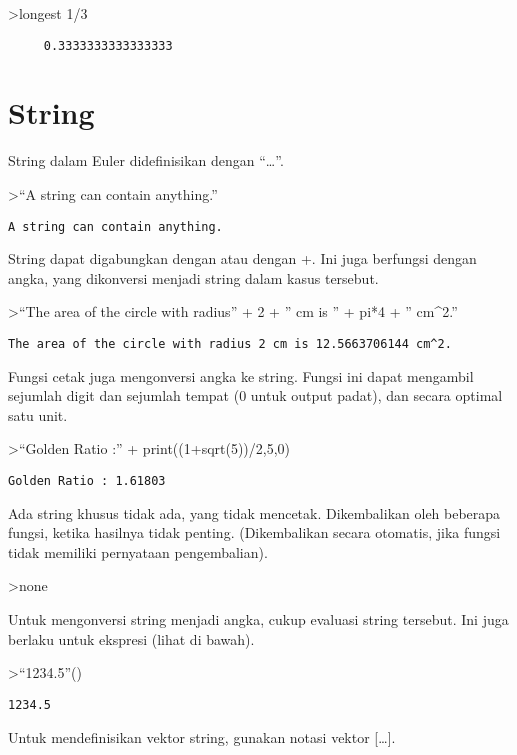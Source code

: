 \documentclass[
]{book}
\begin{document}
\textgreater longest 1/3

\begin{verbatim}
     0.3333333333333333 
\end{verbatim}

\section{String}\label{string}

String dalam Euler didefinisikan dengan ``\ldots{}''.

\textgreater{}``A string can contain anything.''

\begin{verbatim}
A string can contain anything.
\end{verbatim}

String dapat digabungkan dengan \textbar{} atau dengan +. Ini juga berfungsi dengan angka, yang dikonversi menjadi string dalam kasus tersebut.

\textgreater{}``The area of the circle with radius'' + 2 + '' cm is '' + pi*4 + '' cm\^{}2.''

\begin{verbatim}
The area of the circle with radius 2 cm is 12.5663706144 cm^2.
\end{verbatim}

Fungsi cetak juga mengonversi angka ke string. Fungsi ini dapat mengambil sejumlah digit dan sejumlah tempat (0 untuk output padat), dan secara optimal satu unit.

\textgreater{}``Golden Ratio :'' + print((1+sqrt(5))/2,5,0)

\begin{verbatim}
Golden Ratio : 1.61803
\end{verbatim}

Ada string khusus tidak ada, yang tidak mencetak. Dikembalikan oleh beberapa fungsi, ketika hasilnya tidak penting. (Dikembalikan secara otomatis, jika fungsi tidak memiliki pernyataan pengembalian).

\textgreater none

Untuk mengonversi string menjadi angka, cukup evaluasi string tersebut. Ini juga berlaku untuk ekspresi (lihat di bawah).

\textgreater{}``1234.5''()

\begin{verbatim}
1234.5
\end{verbatim}

Untuk mendefinisikan vektor string, gunakan notasi vektor {[}\ldots{]}.
\end{document}
